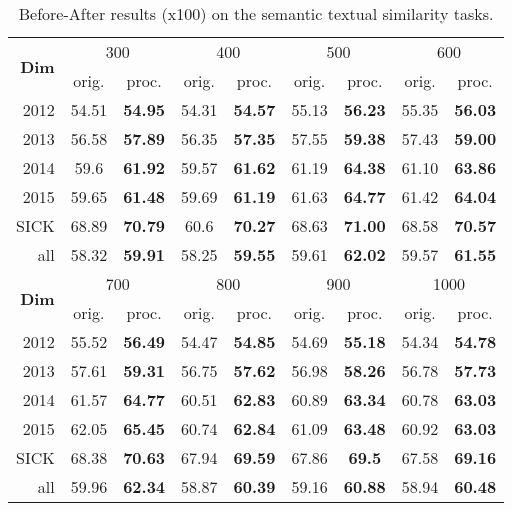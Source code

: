 \documentclass{article} \usepackage{acl2017,times}
\begin{document}
\begin{table}[!h]
\centering
\begin{tabular}{|r|c|c|c|c|c|c|c|c|}
\hline
\multirow{2}{*}{\bf Dim} & \multicolumn{2}{c|}{300} & \multicolumn{2}{c|}{400} & \multicolumn{2}{c|}{500} & \multicolumn{2}{c|}{600}  \\ \cline{2-9} 
                         & orig.  & proc.           & orig.  & proc.           & orig.  & proc.           & orig.   & proc.           \\ \hline
2012                     & 54.51  & \textbf{54.95}  & 54.31  & \textbf{54.57}  & 55.13  & \textbf{56.23}  & 55.35   & \textbf{56.03}  \\ \hline
2013                     & 56.58  & \textbf{57.89}  & 56.35  & \textbf{57.35}  & 57.55  & \textbf{59.38}  & 57.43   & \textbf{59.00}  \\ \hline
2014                     & 59.6   & \textbf{61.92}  & 59.57  & \textbf{61.62}  & 61.19  & \textbf{64.38}  & 61.10   & \textbf{63.86}  \\ \hline
2015                     & 59.65  & \textbf{61.48}  & 59.69  & \textbf{61.19}  & 61.63  & \textbf{64.77}  & 61.42   & \textbf{64.04}  \\ \hline
SICK                     & 68.89  & \textbf{70.79}  & 60.6   & \textbf{70.27}  & 68.63  & \textbf{71.00}  & 68.58   & \textbf{70.57}  \\ \hline
all                      & 58.32  & \textbf{59.91}  & 58.25  & \textbf{59.55}  & 59.61  & \textbf{62.02}  & 59.57   & \textbf{61.55}  \\ \hline
\multirow{2}{*}{\bf Dim} & \multicolumn{2}{c|}{700} & \multicolumn{2}{c|}{800} & \multicolumn{2}{c|}{900} & \multicolumn{2}{c|}{1000} \\ \cline{2-9} 
                         & orig.  & proc.           & orig.  & proc.           & orig.  & proc.           & orig.   & proc.           \\ \hline
2012                     & 55.52  & \textbf{56.49}  & 54.47  & \textbf{54.85}  & 54.69  & \textbf{55.18}  & 54.34   & \textbf{54.78}  \\ \hline
2013                     & 57.61  & \textbf{59.31}  & 56.75  & \textbf{57.62}  & 56.98  & \textbf{58.26}  & 56.78   & \textbf{57.73}  \\ \hline
2014                     & 61.57  & \textbf{64.77}  & 60.51  & \textbf{62.83}  & 60.89  & \textbf{63.34}  & 60.78   & \textbf{63.03}  \\ \hline
2015                     & 62.05  & \textbf{65.45}  & 60.74  & \textbf{62.84}  & 61.09  & \textbf{63.48}  & 60.92   & \textbf{63.03}  \\ \hline
SICK                     & 68.38  & \textbf{70.63}  & 67.94  & \textbf{69.59}  & 67.86  & \textbf{69.5}   & 67.58   & \textbf{69.16}  \\ \hline
all                      & 59.96  & \textbf{62.34}  & 58.87  & \textbf{60.39}  & 59.16  & \textbf{60.88}  & 58.94   & \textbf{60.48}  \\ \hline
\end{tabular}
\caption{Before-After results (x100) on the semantic textual similarity tasks.}
\label{tb:high-dim-sts}
\end{table}
\end{document}
